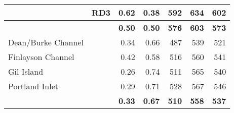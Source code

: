 \documentclass[12pt]{article}\usepackage[]{graphicx}\usepackage[]{color}
\begin{document}
\begin{table}[!h]
\begin{tabular}[t]{llrrrrr}
 & RD3 & 0.62 & 0.38 & 592 & 634 & 602\\
\hline
\textbf{} & \textbf{} & \textbf{0.50} & \textbf{0.50} & \textbf{576} & \textbf{603} & \textbf{573}\\
\hline
Dean/Burke Channel &  & 0.34 & 0.66 & 487 & 539 & 521\\
Finlayson Channel &  & 0.42 & 0.58 & 516 & 560 & 541\\
Gil Island &  & 0.26 & 0.74 & 511 & 565 & 540\\
Portland Inlet &  & 0.29 & 0.71 & 528 & 567 & 546\\
\hline
\textbf{} & \textbf{} & \textbf{0.33} & \textbf{0.67} & \textbf{510} & \textbf{558} & \textbf{537}\\
\bottomrule
\end{tabular}
\end{table}
\clearpage
\end{document}
